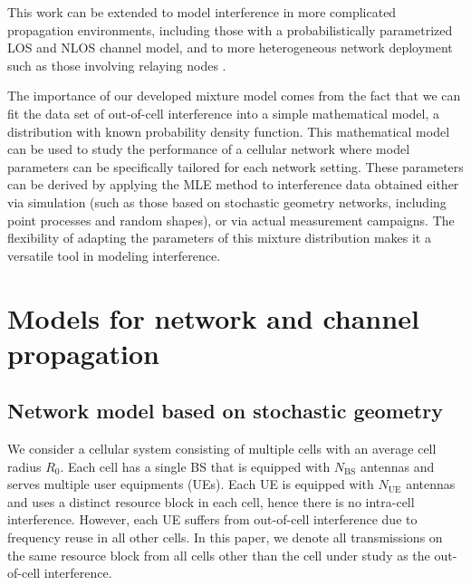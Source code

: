 \documentclass[12pt, draftclsnofoot, onecolumn]{IEEEtran}
\theoremstyle{plain}
\begin{document}
This work can be extended to model interference in more complicated propagation environments, including those with a probabilistically parametrized {LOS} and {NLOS} channel model, and to more heterogeneous network deployment such as those involving relaying nodes \cite{BaiH14,MyArxiv,ref_1r}. 

The importance of our developed mixture model comes from the fact that we can fit the data set of out-of-cell interference into a simple mathematical model, a distribution with known probability density function. This mathematical model can be used to study the performance of a cellular network where model parameters can be specifically tailored for each network setting. These parameters can be derived by applying the MLE method to interference data obtained either via simulation (such as those based on stochastic geometry networks, including point processes and random shapes), or via actual measurement campaigns. The flexibility of adapting the parameters of this mixture distribution makes it a versatile tool in modeling interference.

\vspace{-.1in} 
\section{Models for network and channel propagation}\label{Sec1}
\vspace{-.1in}
\subsection{Network model based on stochastic geometry} \label{GeoModel}\vspace{-.1in}
We consider a cellular system consisting of multiple cells with an average cell radius $R_0$. 
Each cell has a single BS that is equipped with $N_{\text{BS}}$ antennas and serves multiple user equipments (UEs). Each UE is equipped with $N_{\text{UE}}$ antennas and uses a distinct resource block in each cell, hence there is no intra-cell interference. However, each UE suffers from  out-of-cell interference due to frequency reuse in all other cells. In this paper, we denote all transmissions on the same resource block from all cells other than the cell under study as the out-of-cell interference.   
 
\end{document}
